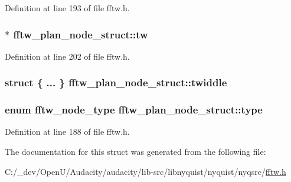 Definition at line 193 of file fftw.\+h.

\subsubsection[{\texorpdfstring{tw}{tw}}]{$\ast$ fftw\+\_\+plan\+\_\+node\+\_\+struct\+::tw}\hypertarget{structfftw__plan__node__struct_a4a7244edea4157eb541d712ae30e2fab}{}\label{structfftw__plan__node__struct_a4a7244edea4157eb541d712ae30e2fab}


Definition at line 202 of file fftw.\+h.

\subsubsection[{\texorpdfstring{twiddle}{twiddle}}]{\setlength{\rightskip}{0pt plus 5cm}struct \{ ... \}   fftw\+\_\+plan\+\_\+node\+\_\+struct\+::twiddle}\hypertarget{structfftw__plan__node__struct_ad97cd656eb14d56e493dabe65eb10390}{}\label{structfftw__plan__node__struct_ad97cd656eb14d56e493dabe65eb10390}
\subsubsection[{\texorpdfstring{type}{type}}]{\setlength{\rightskip}{0pt plus 5cm}enum {\bf fftw\+\_\+node\+\_\+type} fftw\+\_\+plan\+\_\+node\+\_\+struct\+::type}\hypertarget{structfftw__plan__node__struct_a726e9ec82efd03cdc7b8be71c0c7225f}{}\label{structfftw__plan__node__struct_a726e9ec82efd03cdc7b8be71c0c7225f}


Definition at line 188 of file fftw.\+h.



The documentation for this struct was generated from the following file\+:\begin{DoxyCompactItemize}
\item 
C\+:/\+\_\+dev/\+Open\+U/\+Audacity/audacity/lib-\/src/libnyquist/nyquist/nyqsrc/\hyperlink{fftw_8h}{fftw.\+h}\end{DoxyCompactItemize}
